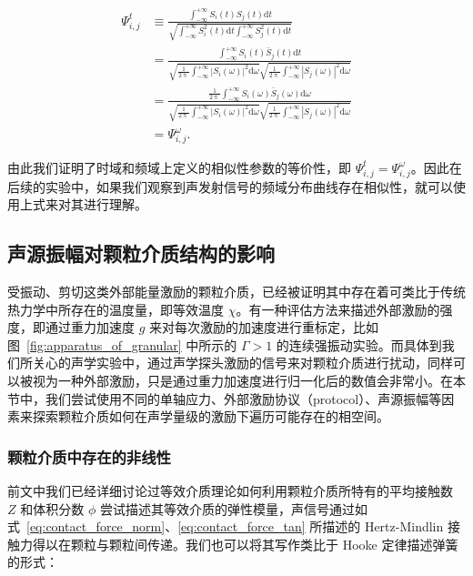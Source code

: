 \begin{equation}
  \begin{aligned}
    \Psi_{i,j}^{t} &\equiv \frac{\int_{-\infty}^{+\infty}S_{i}(t)S_{j}(t)\mathrm{d}t}{\sqrt{\int_{-\infty}^{+\infty}S_{i}^{2}(t)\mathrm{d}t\int_{-\infty}^{+\infty}S_{j}^{2}(t)\mathrm{d}t}}\\
    &= \frac{\int_{-\infty}^{+\infty}S_{i}(t)\bar{S}_{j}(t)\mathrm{d}t}{\sqrt{\frac{1}{2\uppi}\int_{-\infty}^{+\infty}|S_{i}(\omega)|^{2}\mathrm{d}\omega}\sqrt{\frac{1}{2\uppi}\int_{-\infty}^{+\infty}|S_{j}(\omega)|^{2}\mathrm{d}\omega}}\\
    &= \frac{\frac{1}{2\uppi}\int_{-\infty}^{+\infty}S_{i}(\omega)\bar{S}_{j}(\omega)\mathrm{d}\omega}{\sqrt{\frac{1}{2\uppi}\int_{-\infty}^{+\infty}|S_{i}(\omega)|^{2}\mathrm{d}\omega}\sqrt{\frac{1}{2\uppi}\int_{-\infty}^{+\infty}|S_{j}(\omega)|^{2}\mathrm{d}\omega}}\\
    &= \Psi_{i,j}^{\omega}.
  \end{aligned}
\end{equation}

由此我们证明了时域和频域上定义的相似性参数的等价性，即 $\Psi_{i,j}^{t}=\Psi_{i,j}^{\omega}$。因此在后续的实验中，如果我们观察到声发射信号的频域分布曲线存在相似性，就可以使用上式来对其进行理解。

\subsection{声源振幅对颗粒介质结构的影响}

受振动、剪切这类外部能量激励的颗粒介质，已经被证明其中存在着可类比于传统热力学中所存在的温度量，即等效温度 $\chi$。有一种评估方法来描述外部激励的强度，即通过重力加速度 $g$ 来对每次激励的加速度进行重标定，比如图~\ref{fig:apparatus_of_granular} 中所示的 $\Gamma>1$ 的连续强振动实验。而具体到我们所关心的声学实验中，通过声学探头激励的信号来对颗粒介质进行扰动，同样可以被视为一种外部激励，只是通过重力加速度进行归一化后的数值会非常小。在本节中，我们尝试使用不同的单轴应力、外部激励协议（protocol）、声源振幅等因素来探索颗粒介质如何在声学量级的激励下遍历可能存在的相空间。


\subsubsection{颗粒介质中存在的非线性}

前文中我们已经详细讨论过等效介质理论如何利用颗粒介质所特有的平均接触数 $Z$ 和体积分数 $\phi$ 尝试描述其等效介质的弹性模量，声信号通过如式~\eqref{eq:contact_force_norm}、\eqref{eq:contact_force_tan} 所描述的 Hertz-Mindlin 接触力得以在颗粒与颗粒间传递。我们也可以将其写作类比于 Hooke 定律描述弹簧的形式：

